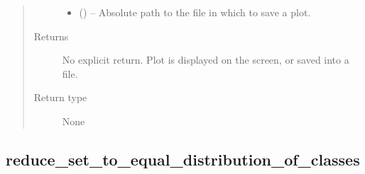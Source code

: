 \documentclass[a4paper,10pt,english]{sphinxmanual}
\begin{document}
\begin{fulllineitems}
\begin{quote}
\begin{description}
\begin{itemize}
\item {} 
 () -- Absolute path to the file in which to save a plot.

\end{itemize}

\item[{Returns}] \leavevmode
No explicit return. Plot is displayed on the screen, or saved
into a file.

\item[{Return type}] \leavevmode
None

\end{description}\end{quote}

\end{fulllineitems}



\subsection{reduce\_set\_to\_equal\_distribution\_of\_classes}
\label{\detokenize{api/ucf.reduce_set_to_equal_distribution_of_classes:reduce-set-to-equal-distribution-of-classes}}\label{\detokenize{api/ucf.reduce_set_to_equal_distribution_of_classes::doc}}
\end{document}
